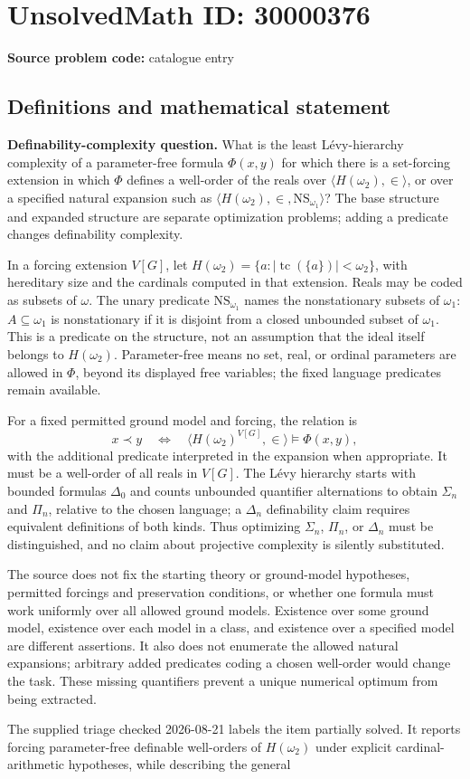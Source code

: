\documentclass[11pt]{article}
\begin{document}
\section*{UnsolvedMath ID: 30000376}
\textbf{Source problem code:} catalogue entry
\subsection{Definitions and mathematical statement}
\textbf{Definability-complexity question.} What is the least L\'evy-hierarchy complexity of a parameter-free formula \(\Phi(x,y)\) for which there is a set-forcing extension in which \(\Phi\) defines a well-order of the reals over \(\langle H(\omega_2),\in\rangle\), or over a specified natural expansion such as \(\langle H(\omega_2),\in,\mathrm{NS}_{\omega_1}\rangle\)? The base structure and expanded structure are separate optimization problems; adding a predicate changes definability complexity.\par In a forcing extension \(V[G]\), let \(H(\omega_2)=\{a:|\operatorname{tc}(\{a\})|<\omega_2\}\), with hereditary size and the cardinals computed in that extension. Reals may be coded as subsets of \(\omega\). The unary predicate \(\mathrm{NS}_{\omega_1}\) names the nonstationary subsets of \(\omega_1\): \(A\subseteq\omega_1\) is nonstationary if it is disjoint from a closed unbounded subset of \(\omega_1\). This is a predicate on the structure, not an assumption that the ideal itself belongs to \(H(\omega_2)\). Parameter-free means no set, real, or ordinal parameters are allowed in \(\Phi\), beyond its displayed free variables; the fixed language predicates remain available.\par For a fixed permitted ground model and forcing, the relation is\[x\prec y\quad\Longleftrightarrow\quad\langle H(\omega_2)^{V[G]},\in\rangle\models\Phi(x,y),\] with the additional predicate interpreted in the expansion when appropriate. It must be a well-order of all reals in \(V[G]\). The L\'evy hierarchy starts with bounded formulas \(\Delta_0\) and counts unbounded quantifier alternations to obtain \(\Sigma_n\) and \(\Pi_n\), relative to the chosen language; a \(\Delta_n\) definability claim requires equivalent definitions of both kinds. Thus optimizing \(\Sigma_n\), \(\Pi_n\), or \(\Delta_n\) must be distinguished, and no claim about projective complexity is silently substituted.\par The source does not fix the starting theory or ground-model hypotheses, permitted forcings and preservation conditions, or whether one formula must work uniformly over all allowed ground models. Existence over some ground model, existence over each model in a class, and existence over a specified model are different assertions. It also does not enumerate the allowed natural expansions; arbitrary added predicates coding a chosen well-order would change the task. These missing quantifiers prevent a unique numerical optimum from being extracted.\par The supplied triage checked 2026-08-21 labels the item partially solved. It reports forcing parameter-free definable well-orders of \(H(\omega_2)\) under explicit cardinal-arithmetic hypotheses, while describing the general 
\end{document}
